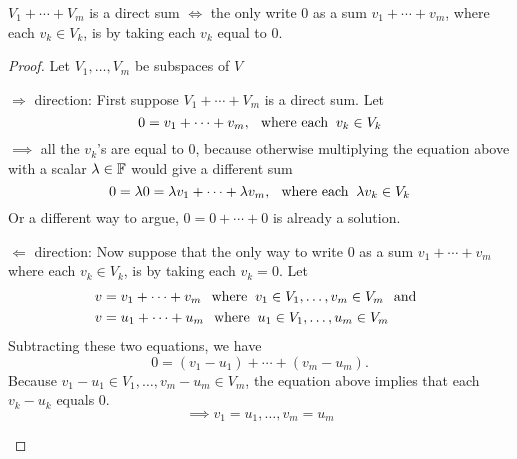 \setcounter{thm}{44}
\begin{thm} 
  \label{condition-for-a-direct-sum}
  $V_1 + \cdots + V_m$ is a direct sum $\iff$ the only write $0$ as a sum $v_1 + \cdots + v_m$, where each $v_k \in V_k$, is by taking each $v_k$ equal to $0$.
\end{thm}
\begin{proof} Let  $V_1, \ldots, V_m$ be subspaces of $V$ 
  \begin{description}
    \item{$\Rightarrow$ direction:} First suppose $V_1 + \cdots + V_m$ is a direct sum. Let
    \begin{equation}
      0 = v_1 + \cdots + v_m, \;\;\, \text{where each}\;\; v_k \in V_k
    \end{equation}
    $\implies$ all the $v_k$'s are equal to $0$, because otherwise multiplying the equation above with a scalar $\lambda \in \mathbb{F}$ would give a different sum
    \begin{equation}
      0 = \lambda0= \lambda v_1 + \cdots + \lambda v_m, \;\;\, \text{where each}\;\; \lambda v_k \in V_k
    \end{equation}
    Or a different way to argue, $0 = 0 + \cdots + 0$ is already a solution.

    \item{$\Leftarrow$ direction:} Now suppose that the only way to write $0$ as a sum $v_1 + \cdots + v_m$ where each $v_k \in V_k$, is by taking each $v_k = 0$. Let
    \begin{equation}
      \begin{aligned}
        v&=v_1 + \cdots + v_m \;\;\, \text{where}\;\; v_1 \in V_1, \ldots, v_m \in V_m \;\;\, \text{and}\;\; \\
        v&=u_1 + \cdots + u_m  \;\;\, \text{where}\;\; u_1 \in V_1, \ldots, u_m \in V_m
      \end{aligned}
    \end{equation}
    Subtracting these two equations, we have
    \begin{equation}
      0=(v_1-u_1)+\cdots+(v_m-u_m).
    \end{equation}
    Because $v_1 - u_1 \in V_1, \dots , v_m - u_m \in V_m$, the equation above implies that each $v_k -u_k$ equals $0$.
    \begin{equation}
      \implies v_1=u_1, \ldots, v_m=u_m
    \end{equation}
  \end{description}
\end{proof}

